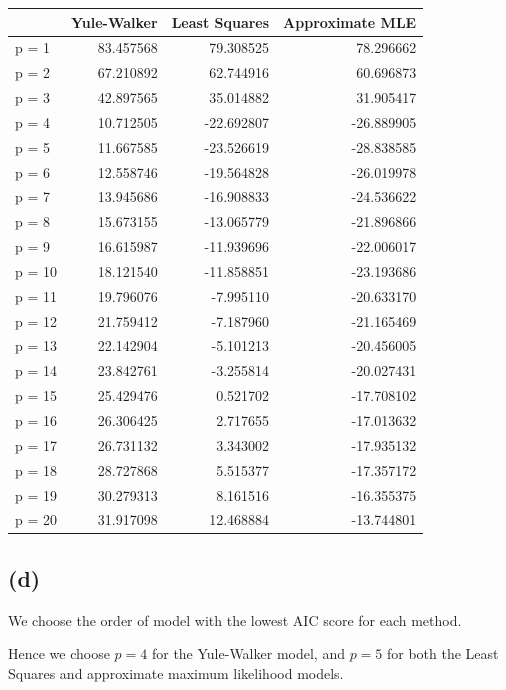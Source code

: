 \documentclass[a4paper,11pt]{article}
\theoremstyle{mytheor}
\begin{document}
\begin{tabular}{lrrr}
\toprule
{} &  Yule-Walker &  Least Squares &  Approximate MLE \\
\midrule
p = 1  &    83.457568 &      79.308525 &        78.296662 \\
p = 2  &    67.210892 &      62.744916 &        60.696873 \\
p = 3  &    42.897565 &      35.014882 &        31.905417 \\
p = 4  &    10.712505 &     -22.692807 &       -26.889905 \\
p = 5  &    11.667585 &     -23.526619 &       -28.838585 \\
p = 6  &    12.558746 &     -19.564828 &       -26.019978 \\
p = 7  &    13.945686 &     -16.908833 &       -24.536622 \\
p = 8  &    15.673155 &     -13.065779 &       -21.896866 \\
p = 9  &    16.615987 &     -11.939696 &       -22.006017 \\
p = 10 &    18.121540 &     -11.858851 &       -23.193686 \\
p = 11 &    19.796076 &      -7.995110 &       -20.633170 \\
p = 12 &    21.759412 &      -7.187960 &       -21.165469 \\
p = 13 &    22.142904 &      -5.101213 &       -20.456005 \\
p = 14 &    23.842761 &      -3.255814 &       -20.027431 \\
p = 15 &    25.429476 &       0.521702 &       -17.708102 \\
p = 16 &    26.306425 &       2.717655 &       -17.013632 \\
p = 17 &    26.731132 &       3.343002 &       -17.935132 \\
p = 18 &    28.727868 &       5.515377 &       -17.357172 \\
p = 19 &    30.279313 &       8.161516 &       -16.355375 \\
p = 20 &    31.917098 &      12.468884 &       -13.744801 \\
\bottomrule
\end{tabular}

\subsection*{(d)}
We choose the order of model with the lowest AIC score for each method.

Hence we choose $p = 4$ for the Yule-Walker model, and $p=5$ for both the Least Squares and approximate maximum likelihood models.
\end{document}
